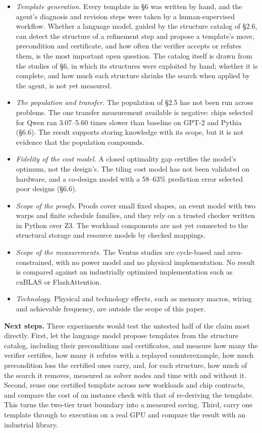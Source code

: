 \documentclass[11pt]{article}
\providecommand{\tightlist}{\setlength{\itemsep}{0pt}\setlength{\parskip}{0pt}}
\begin{document}
\begin{itemize}
\tightlist
\item
  \emph{Template generation.} Every template in §6 was written by hand, and the agent's diagnosis and revision steps were taken by a human-supervised workflow. Whether a language model, guided by the structure catalog of §2.6, can detect the structure of a refinement step and propose a template's move, precondition and certificate, and how often the verifier accepts or refutes them, is the most important open question. The catalog itself is drawn from the studies of §6, in which its structures were exploited by hand; whether it is complete, and how much each structure shrinks the search when applied by the agent, is not yet measured.
\item
  \emph{The population and transfer.} The population of §2.5 has not been run across problems. The one transfer measurement available is negative: chips selected for Qwen ran 3.07--5.60 times slower than baseline on GPT-2 and Pythia (§6.6). The result supports storing knowledge with its scope, but it is not evidence that the population compounds.
\item
  \emph{Fidelity of the cost model.} A closed optimality gap certifies the model's optimum, not the design's. The tiling cost model has not been validated on hardware, and a co-design model with a 58--63\% prediction error selected poor designs (§6.6).
\item
  \emph{Scope of the proofs.} Proofs cover small fixed shapes, an event model with two warps and finite schedule families, and they rely on a trusted checker written in Python over Z3. The workload components are not yet connected to the structural storage and resource models by checked mappings.
\item
  \emph{Scope of the measurements.} The Ventus studies are cycle-based and area-constrained, with no power model and no physical implementation. No result is compared against an industrially optimized implementation such as cuBLAS or FlashAttention.
\item
  \emph{Technology.} Physical and technology effects, such as memory macros, wiring and achievable frequency, are outside the scope of this paper.
\end{itemize}

\textbf{Next steps.} Three experiments would test the untested half of the claim most directly. First, let the language model propose templates from the structure catalog, including their preconditions and certificates, and measure how many the verifier certifies, how many it refutes with a replayed counterexample, how much precondition loss the certified ones carry, and, for each structure, how much of the search it removes, measured as solver nodes and time with and without it. Second, reuse one certified template across new workloads and chip contracts, and compare the cost of an instance check with that of re-deriving the template. This turns the two-tier trust boundary into a measured saving. Third, carry one template through to execution on a real GPU and compare the result with an industrial library.
\end{document}
